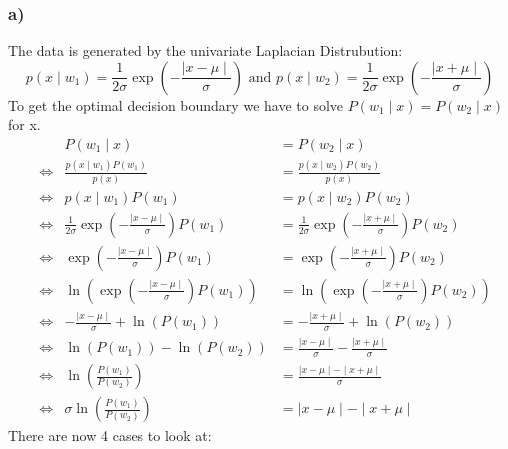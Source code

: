 \documentclass[10pt,a4paper]{article}
\begin{document}
\subsubsection*{a)}
The data is generated by the univariate Laplacian Distrubution:
$$p(x\mid w_1) = \frac{1}{2\sigma}\exp\left(-\frac{\mid x - \mu \mid}{\sigma}\right) \textrm{ and } p(x\mid w_2) = \frac{1}{2\sigma}\exp\left(-\frac{\mid x + \mu \mid}{\sigma}\right)$$
To get the optimal decision boundary we have to solve $P(w_1\mid x) = P(w_2 \mid x)$ for x.
\begin{align*}
&& P(w_1 \mid x) &= P(w_2 \mid x) \\
&\Leftrightarrow &\frac{p(x \mid w_1)P(w_1)}{p(x)} &= \frac{p(x \mid w_2)P(w_2)}{p(x)} \\
&\Leftrightarrow &p(x\mid w_1)P(w_1) &= p(x \mid w_2)P(w_2) \\
&\Leftrightarrow &\frac{1}{2\sigma}\exp\left(-\frac{\mid x - \mu \mid}{\sigma}\right)P(w_1) &= \frac{1}{2\sigma}\exp\left(-\frac{\mid x + \mu \mid}{\sigma}\right)P(w_2) \\
&\Leftrightarrow &\exp\left(-\frac{\mid x - \mu \mid}{\sigma}\right)P(w_1) &= \exp\left(-\frac{\mid x + \mu \mid}{\sigma}\right)P(w_2) \\
&\Leftrightarrow &\ln(\exp\left(-\frac{\mid x - \mu \mid}{\sigma}\right)P(w_1)) &= \ln(\exp\left(-\frac{\mid x + \mu \mid}{\sigma}\right)P(w_2)) \\
&\Leftrightarrow &-\frac{\mid x - \mu \mid}{\sigma} + \ln(P(w_1)) &= -\frac{\mid x + \mu \mid}{\sigma} + \ln(P(w_2)) \\
&\Leftrightarrow & \ln(P(w_1)) - \ln(P(w_2)) &= \frac{\mid x - \mu \mid}{\sigma} - \frac{\mid x + \mu \mid}{\sigma} \\
&\Leftrightarrow & \ln\left(\frac{P(w_1)}{P(w_2)}\right) &= \frac{\mid x - \mu \mid - \mid x + \mu \mid}{\sigma} \\
&\Leftrightarrow & \sigma\ln\left(\frac{P(w_1)}{P(w_2)}\right) &= \mid x - \mu \mid - \mid x + \mu \mid
\end{align*}
There are now 4 cases to look at:
\end{document}
